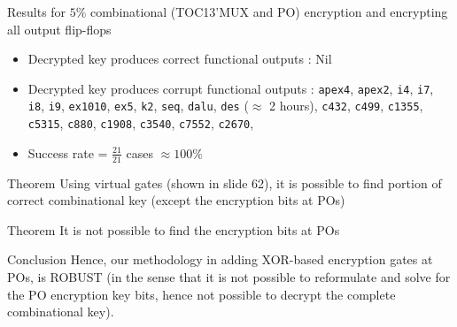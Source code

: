 \begin{frame}{Results for $5\%$ combinational (TOC13'MUX and PO) encryption and encrypting all output flip-flops}
\begin{itemize}
\item Decrypted key produces correct functional outputs : \alert{Nil}
\item Decrypted key produces corrupt functional outputs : \texttt{apex4}, \texttt{apex2}, \texttt{i4}, \texttt{i7}, \texttt{i8}, \texttt{i9}, \texttt{ex1010}, \texttt{ex5},  \texttt{k2}, \texttt{seq},  \texttt{dalu},  \texttt{des} ($\approx$ 2 hours), \texttt{c432}, \texttt{c499}, \texttt{c1355}, \texttt{c5315}, \texttt{c880}, \texttt{c1908}, \texttt{c3540}, \texttt{c7552}, \texttt{c2670}, 
\item Success rate = $\frac{21}{21}$ cases \alert{$\approx 100 \%$}
\end{itemize}
\end{frame}


\begin{frame}{Theorem}
Using virtual gates (shown in slide 62), it is possible to find portion of correct combinational key (except the encryption bits at POs)
\end{frame}

\begin{frame}{Theorem}
It is not possible to find the encryption bits at POs
\end{frame}

\begin{frame}{Conclusion}
Hence, our methodology in adding XOR-based encryption gates at POs, is ROBUST (in the sense that it is not possible to reformulate and solve for the PO encryption key bits, hence not possible to decrypt the complete combinational key). 
\end{frame}

